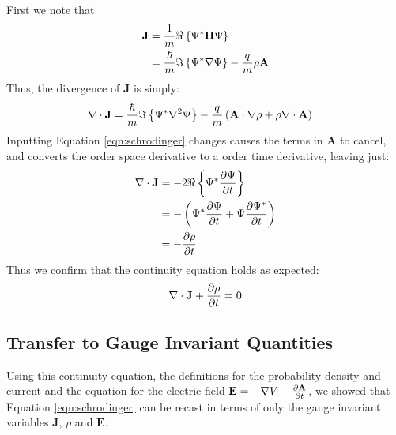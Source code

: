 \noindent First we note that
\begin{align}
    \mathbf{J} &= \frac{1}{m} \Re \left\{ \Psi^* \mathbf{\Pi} \Psi \right\} \\
               &= \frac{\hbar}{m} \Im \left\{ \Psi^* \nabla \Psi \right\} - \frac{q}{m} \rho
                    \mathbf{A}
\end{align}
Thus, the divergence of $\mathbf{J}$ is simply:
\begin{align}
    \nabla \cdot \mathbf{ J } &= \frac{\hbar}{m} \Im \left\{ \Psi^* \nabla^2 \Psi \right\} - \frac{q}{m} \left(
                \mathbf{A} \cdot \nabla \rho + \rho \nabla \cdot
                \mathbf{A} \right)
\end{align}
Inputting Equation \ref{eqn:schrodinger} changes causes the terms in
$\mathbf{A}$ to cancel, and converts the  order space
derivative to a  order time derivative, leaving just:
\begin{align}
    \nabla \cdot \mathbf{ J } &= -2 \Re \left\{ \Psi^* \frac{\partial \Psi}{\partial t} \right\} \\
            &= - \left( \Psi^* \frac{\partial \Psi}{\partial t}
               + \Psi \frac{\partial \Psi^*}{\partial t} \right) \\
            &= - \frac{\partial \rho}{\partial t}
\end{align}
Thus we confirm that the continuity equation holds as expected:
\begin{align}
    \nabla \cdot \mathbf{ J } + \frac{\partial \rho}{\partial t} = 0
    \label{eqn:continuity}
\end{align}

\subsection{Transfer to Gauge Invariant Quantities}

Using this continuity equation, the definitions for the probability density and
current and the equation for the electric field $\mathbf{E} = - \nabla V -
\frac{\partial \mathbf{A}}{\partial t}$, we showed that Equation \ref{eqn:schrodinger} can be recast
in terms of only the gauge invariant variables $\mathbf{J}$, $\rho$ and
$\mathbf{E}$.

